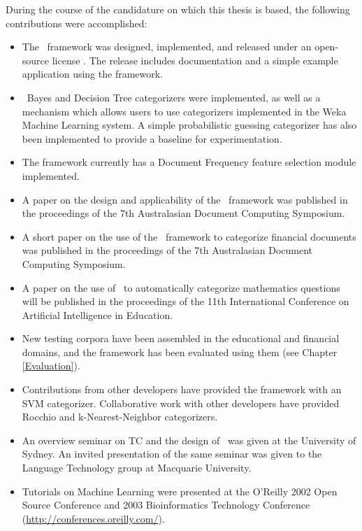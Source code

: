 During the course of the candidature on which this thesis is based,
the following contributions were accomplished:

\begin{itemize}
\item The \aicat\ framework was designed, implemented, and released
  under an open-source license \cite{cpan}.  The release includes
  documentation and a simple example application using the framework.
\item \naive\ Bayes and Decision Tree categorizers were implemented,
  as well as a mechanism which allows users to use categorizers
  implemented in the Weka Machine Learning system\cite{weka:99}.  A
  simple probabilistic guessing categorizer has also been implemented
  to provide a baseline for experimentation.
\item The framework currently has a Document Frequency feature
  selection module implemented.
\item A paper on the design and applicability of the \aicat\ framework
  was published in the proceedings of the 7th Australasian Document
  Computing Symposium. \cite{williams:02}
\item A short paper on the use of the \aicat\ framework to categorize
  financial documents was published in the proceedings of the
  7th Australasian Document Computing Symposium. \cite{calvo:02}
\item A paper on the use of \aicat\ to automatically categorize
  mathematics questions will be published in the
  proceedings of the 11th International Conference on Artificial Intelligence in
  Education.  \cite{williams:03}
\item New testing corpora have been assembled in the educational and
  financial domains, and the framework has been evaluated using them
  (see Chapter \ref{Evaluation}).
\item Contributions from other developers have provided the framework
  with an SVM categorizer.  Collaborative work with other developers
  have provided Rocchio and k-Nearest-Neighbor categorizers.
\item An overview seminar on TC and the design of \aicat\ was given at
  the University of Sydney.  An invited presentation of the same
  seminar was given to the Language Technology group at Macquarie
  University.
\item Tutorials on Machine Learning were presented at the O'Reilly
  2002 Open Source Conference and 2003 Bioinformatics Technology
  Conference (\url{http://conferences.oreilly.com/}).
\end{itemize}

